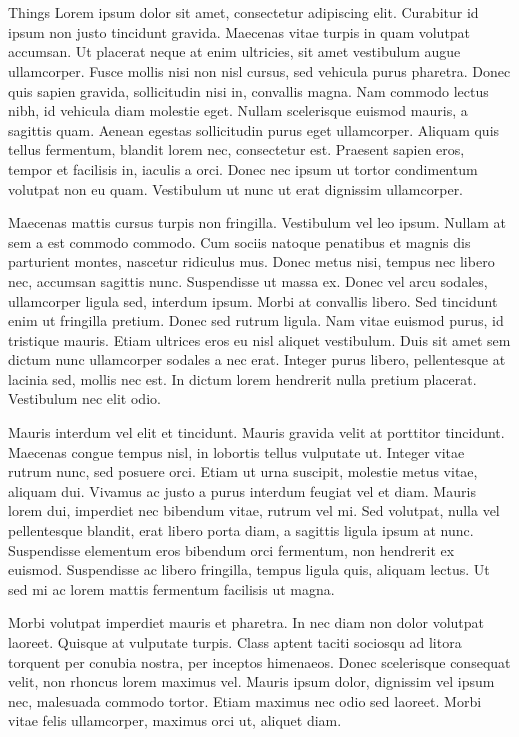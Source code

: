 \documentclass[12pt]{beamer}
\renewcommand{\maketitle}{%
	\begin{center}%
		\Huge\inserttitle\\[7mm]%
		\Large\insertauthor\\[5mm]%
		\Large\insertinstitute%
	\end{center}%
	\vspace*{-2ex}%
}
\begin{document}
\begin{frame}{\maketitle}
\begin{columns}
\begin{column}{.45\textwidth}
\begin{block}{Things}
					Lorem ipsum dolor sit amet, consectetur adipiscing elit. Curabitur id ipsum non justo tincidunt gravida. Maecenas vitae turpis in quam volutpat accumsan. Ut placerat neque at enim ultricies, sit amet vestibulum augue ullamcorper. Fusce mollis nisi non nisl cursus, sed vehicula purus pharetra. Donec quis sapien gravida, sollicitudin nisi in, convallis magna. Nam commodo lectus nibh, id vehicula diam molestie eget. Nullam scelerisque euismod mauris, a sagittis quam. Aenean egestas sollicitudin purus eget ullamcorper. Aliquam quis tellus fermentum, blandit lorem nec, consectetur est. Praesent sapien eros, tempor et facilisis in, iaculis a orci. Donec nec ipsum ut tortor condimentum volutpat non eu quam. Vestibulum ut nunc ut erat dignissim ullamcorper.

					Maecenas mattis cursus turpis non fringilla. Vestibulum vel leo ipsum. Nullam at sem a est commodo commodo. Cum sociis natoque penatibus et magnis dis parturient montes, nascetur ridiculus mus. Donec metus nisi, tempus nec libero nec, accumsan sagittis nunc. Suspendisse ut massa ex. Donec vel arcu sodales, ullamcorper ligula sed, interdum ipsum. Morbi at convallis libero. Sed tincidunt enim ut fringilla pretium. Donec sed rutrum ligula. Nam vitae euismod purus, id tristique mauris. Etiam ultrices eros eu nisl aliquet vestibulum. Duis sit amet sem dictum nunc ullamcorper sodales a nec erat. Integer purus libero, pellentesque at lacinia sed, mollis nec est. In dictum lorem hendrerit nulla pretium placerat. Vestibulum nec elit odio.

					Mauris interdum vel elit et tincidunt. Mauris gravida velit at porttitor tincidunt. Maecenas congue tempus nisl, in lobortis tellus vulputate ut. Integer vitae rutrum nunc, sed posuere orci. Etiam ut urna suscipit, molestie metus vitae, aliquam dui. Vivamus ac justo a purus interdum feugiat vel et diam. Mauris lorem dui, imperdiet nec bibendum vitae, rutrum vel mi. Sed volutpat, nulla vel pellentesque blandit, erat libero porta diam, a sagittis ligula ipsum at nunc. Suspendisse elementum eros bibendum orci fermentum, non hendrerit ex euismod. Suspendisse ac libero fringilla, tempus ligula quis, aliquam lectus. Ut sed mi ac lorem mattis fermentum facilisis ut magna.

					Morbi volutpat imperdiet mauris et pharetra. In nec diam non dolor volutpat laoreet. Quisque at vulputate turpis. Class aptent taciti sociosqu ad litora torquent per conubia nostra, per inceptos himenaeos. Donec scelerisque consequat velit, non rhoncus lorem maximus vel. Mauris ipsum dolor, dignissim vel ipsum nec, malesuada commodo tortor. Etiam maximus nec odio sed laoreet. Morbi vitae felis ullamcorper, maximus orci ut, aliquet diam.


\end{block}
\end{column}
\end{columns}
\end{frame}
\end{document}
